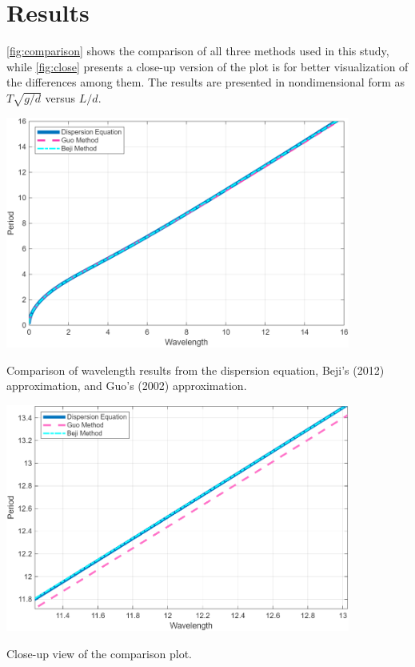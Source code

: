 \documentclass[a4paper, 11pt]{article}
\newenvironment{Figure}
  {\par\medskip\noindent\minipage{\linewidth}
   \captionsetup{type=figure}}
  {\endminipage\par\medskip}
\begin{document}
\section{Results}

\hspace{0.5cm}\autoref{fig:comparison} shows the comparison of all three methods used in this study, while \autoref{fig:close} presents a close-up version of the plot is for better visualization of the differences among them. The results are presented in nondimensional form as $T \sqrt{g/d}$ versus $L/d$.

\begin{Figure}
    \centering
    \includegraphics[width=0.85\textwidth]{HW1_plot.png}
    \caption{Comparison of wavelength results from the dispersion equation, Beji's (2012) approximation, and Guo's (2002) approximation.}
    \label{fig:comparison}
\end{Figure}

\begin{Figure}
    \centering
    \includegraphics[width=0.85\textwidth]{close.png}
    \caption{Close-up view of the comparison plot.}
    \label{fig:close}
\end{Figure}
\end{document}
